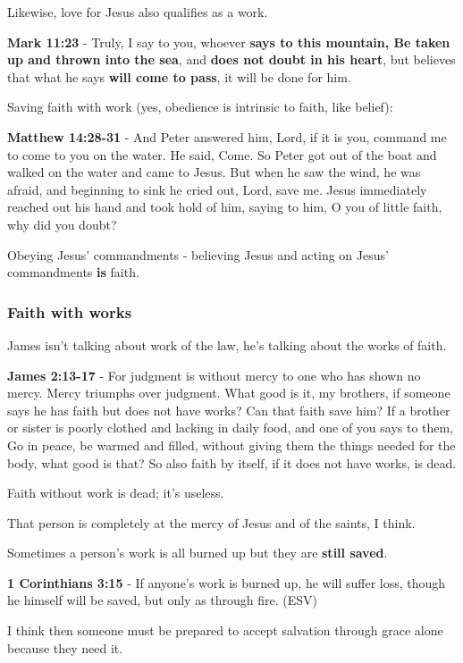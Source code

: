 \documentclass[11pt]{article}
\begin{document}
Likewise, love for Jesus also qualifies as a work.

\textbf{Mark 11:23} - Truly, I say to you, whoever \textbf{says to this mountain, Be taken up and thrown into the sea}, and \textbf{does not doubt in his heart}, but believes that what he says \textbf{will come to pass}, it will be done for him.

Saving faith with work (yes, obedience is intrinsic to faith, like belief):

\textbf{Matthew 14:28-31} - And Peter answered him, Lord, if it is you, command me to come to you on the water. He said, Come. So Peter got out of the boat and walked on the water and came to Jesus. But when he saw the wind, he was afraid, and beginning to sink he cried out, Lord, save me. Jesus immediately reached out his hand and took hold of him, saying to him, O you of little faith, why did you doubt?

Obeying Jesus' commandments - believing Jesus and acting on Jesus' commandments \textbf{is} faith.

\subsubsection{Faith with works}
\label{sec:orgb27e99c}
James isn't talking about work of the law, he's talking about the works of faith.

\textbf{James 2:13-17} - For judgment is without mercy to one who has shown no mercy. Mercy triumphs over judgment. What good is it, my brothers, if someone says he has faith but does not have works? Can that faith save him? If a brother or sister is poorly clothed and lacking in daily food, and one of you says to them, Go in peace, be warmed and filled, without giving them the things needed for the body, what good is that? So also faith by itself, if it does not have works, is dead.

Faith without work is dead; it's useless.

That person is completely at the mercy of Jesus and of the saints, I think.

Sometimes a person's work is all burned up but they are \textbf{still saved}.

\textbf{1 Corinthians 3:15} - If anyone's work is burned up, he will suffer loss, though he himself will be saved, but only as through fire. (ESV)

I think then someone must be prepared to accept salvation through grace alone because they need it.
\end{document}
